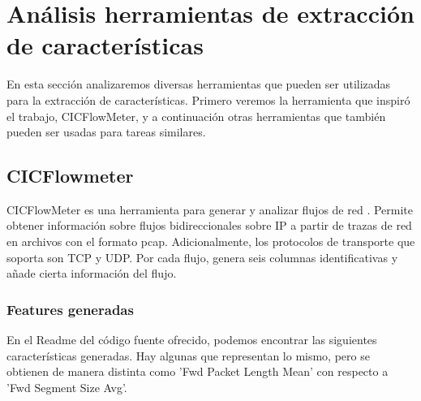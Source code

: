 \section{Análisis herramientas de extracción de características}

En esta sección analizaremos diversas herramientas que pueden ser utilizadas para la extracción de características. Primero veremos la herramienta que inspiró el trabajo, CICFlowMeter, y a continuación otras herramientas que también pueden ser usadas para tareas similares.

\subsection{CICFlowmeter}

CICFlowMeter es una herramienta para generar y analizar flujos de red \cite{cicflowpost} \cite{icissp17} \cite{cicflowrepo}. Permite obtener información sobre flujos bidireccionales sobre IP a partir de trazas de red en archivos con el formato pcap. Adicionalmente, los protocolos de transporte que soporta son TCP y UDP. Por cada flujo, genera seis columnas identificativas y añade cierta información del flujo. 

\subsubsection{Features generadas}

En el Readme del código fuente ofrecido, podemos encontrar las siguientes características generadas. Hay algunas que representan lo mismo, pero se obtienen de manera distinta como 'Fwd Packet Length Mean' con respecto a 'Fwd Segment Size Avg'.

